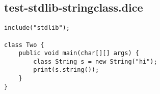\subsection{test-stdlib-stringclass.dice}
\begin{verbatim}
include("stdlib");

class Two {
	public void main(char[][] args) {
        class String s = new String("hi");
        print(s.string());
	}
}

\end{verbatim}